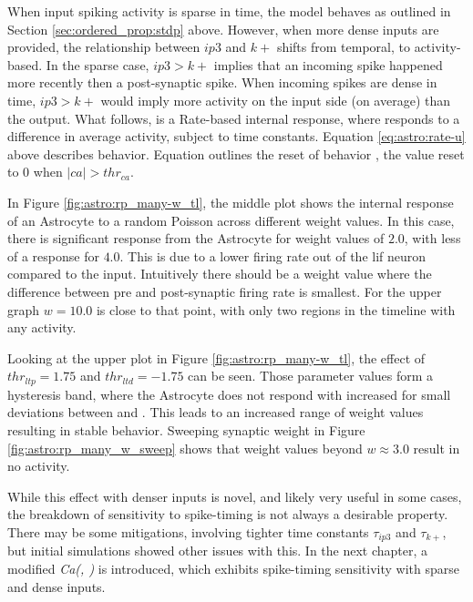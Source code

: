 When input spiking activity is sparse in time, the model behaves as outlined
in Section \ref{sec:ordered_prop:stdp} above. However, when more dense
inputs are provided, the relationship between $ip3$ and $k+$ shifts from
temporal, to activity-based. In the sparse case, $ip3 > k+$ implies that an
incoming spike happened more recently then a post-synaptic spike. When
incoming spikes are dense in time, $ip3 > k+$ would imply more activity on
the input side (on average) than the output. What follows, is a Rate-based
internal response, where \ca responds to a difference in average activity,
subject to time constants. Equation \ref{eq:astro:rate-u} above describes \ca
behavior. Equation \label{eq:astro:u-reset} outlines the reset of behavior \ca,
the value reset to $0$ when $|ca| > thr_{ca}$.

In Figure \ref{fig:astro:rp_many-w_tl}, the middle plot shows the internal
response of an Astrocyte to a random Poisson across different weight values. In
this case, there is significant response from the Astrocyte for weight values of
$2.0$, with less of a response for $4.0$. This is due to a lower firing rate out
of the \Gls{lif} neuron compared to the input. Intuitively there should be a weight
value where the difference between pre and post-synaptic firing rate is
smallest. For the upper graph $w=10.0$ is close to that point, with only two
regions in the timeline with any activity.


Looking at the upper plot in Figure \ref{fig:astro:rp_many-w_tl}, the effect of
$thr_{ltp}=1.75$ and $thr_{ltd}=-1.75$ can be seen. Those parameter values form
a hysteresis band, where the Astrocyte does not respond with increased \ca for
small deviations between \ipt and \kp. This leads to an increased range of
weight values resulting in stable behavior. Sweeping synaptic weight in Figure
\ref{fig:astro:rp_many_w_sweep} shows that weight values beyond $w \approx 3.0$
result in no \ca activity.


While this effect with denser inputs is novel, and likely very useful in some
cases, the breakdown of sensitivity to spike-timing is not always a desirable
property. There may be some mitigations, involving tighter time constants
$\tau_{ip3}$ and $\tau_{k+}$, but initial simulations showed other issues with
this. In the next chapter, a modified \emph{Ca(\ipt, \kp)} is introduced, which
exhibits spike-timing sensitivity with sparse and dense inputs.

